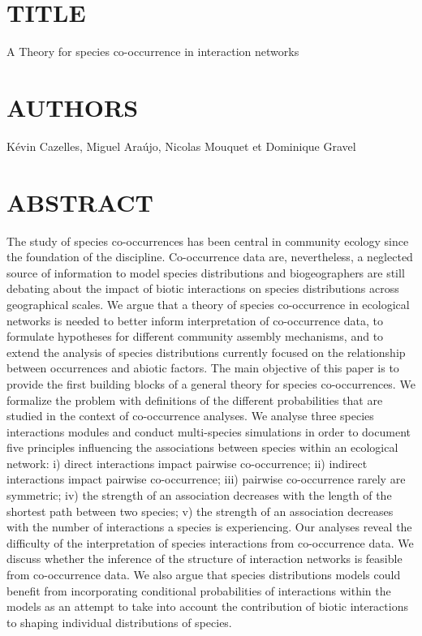 \newpage

\section{TITLE}

A Theory for species co-occurrence in interaction networks

\section{AUTHORS}

Kévin Cazelles, Miguel Ara\'ujo, Nicolas Mouquet et Dominique Gravel

\section{ABSTRACT}

The study of species co-occurrences has been central in community ecology since the foundation of the discipline. Co-occurrence data are, nevertheless, a neglected source of information to model species distributions and biogeographers are still debating about the impact of biotic interactions on species distributions across geographical scales. We argue that a theory of species co-occurrence in ecological networks is needed to better inform interpretation of co-occurrence data, to formulate hypotheses for different community assembly mechanisms, and to extend the analysis of species distributions currently focused on the relationship between occurrences and abiotic factors. The main objective of this paper is to provide the first building blocks of a general theory for species co-occurrences. We formalize the problem with definitions of the different probabilities that are studied in the context of co-occurrence analyses. We analyse three species interactions modules and conduct multi-species simulations in order to document five principles influencing the associations between  species within an ecological network: i) direct interactions impact pairwise co-occurrence; ii) indirect interactions impact pairwise co-occurrence; iii) pairwise co-occurrence rarely are symmetric; iv) the strength of an association decreases with the length of the shortest path between two species; v) the strength of an association decreases with the number of interactions a species is experiencing. Our analyses reveal the difficulty of the interpretation of species interactions from co-occurrence data. We discuss whether the inference of the structure of interaction networks is feasible from co-occurrence data. We also argue that species distributions models could benefit from incorporating conditional probabilities of interactions within the models as an attempt to take into account the contribution of biotic interactions to shaping individual distributions of species.

